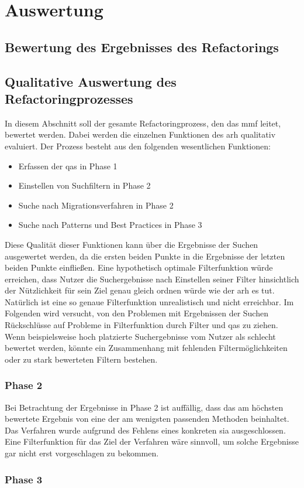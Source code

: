 \chapter{Auswertung}
\label{chap:auswertung}

\section{Bewertung des Ergebnisses des Refactorings}

\section{Qualitative Auswertung des Refactoringprozesses}

In diesem Abschnitt soll der gesamte Refactoringprozess, den das \gls{mmf} leitet, bewertet werden.
Dabei werden die einzelnen Funktionen des \gls{arh} qualitativ evaluiert.
Der Prozess besteht aus den folgenden wesentlichen Funktionen:
\begin{itemize}
	\item Erfassen der \glspl{qa} in Phase 1
	\item Einstellen von Suchfiltern in Phase 2
	\item Suche nach Migrationsverfahren in Phase 2
	\item Suche nach Patterns und Best Practices in Phase 3
\end{itemize}

Diese Qualität dieser Funktionen kann über die Ergebnisse der Suchen ausgewertet werden, da die ersten beiden Punkte in die Ergebnisse der letzten beiden Punkte einfließen.
Eine hypothetisch optimale Filterfunktion würde erreichen, dass Nutzer die Suchergebnisse nach Einstellen seiner Filter hinsichtlich der Nützlichkeit für sein Ziel genau gleich ordnen würde wie der \gls{arh} es tut.
Natürlich ist eine so genaue Filterfunktion unrealistisch und nicht erreichbar.
Im Folgenden wird versucht, von den Problemen mit Ergebnissen der Suchen Rückschlüsse auf Probleme in Filterfunktion durch Filter und \glspl{qa} zu ziehen.
Wenn beispielsweise hoch platzierte Suchergebnisse vom Nutzer als schlecht bewertet werden, könnte ein Zusammenhang mit fehlenden Filtermöglichkeiten oder zu stark bewerteten Filtern bestehen.

\subsection{Phase 2}

Bei Betrachtung der Ergebnisse in Phase 2 ist auffällig, dass das am höchsten bewertete Ergebnis von  eine der am wenigsten passenden Methoden beinhaltet.
Das Verfahren wurde aufgrund des Fehlens eines konkreten \gls{sia} ausgeschlossen.
Eine Filterfunktion für das Ziel der Verfahren wäre sinnvoll, um solche Ergebnisse gar nicht erst vorgeschlagen zu bekommen.

\subsection{Phase 3}


